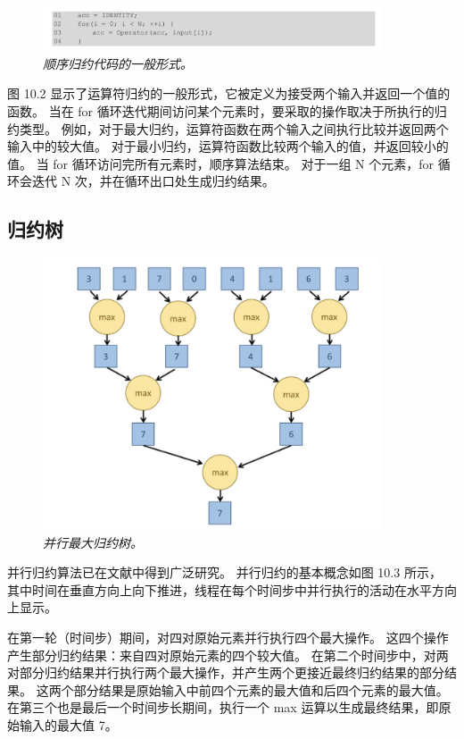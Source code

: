 \begin{figure}[H]
	\centering
	\includegraphics[width=0.9\textwidth]{figs/F10.2.png}
	\caption{\textit{顺序归约代码的一般形式。}}
\end{figure}

图 10.2 显示了运算符归约的一般形式，它被定义为接受两个输入并返回一个值的函数。 
当在 for 循环迭代期间访问某个元素时，要采取的操作取决于所执行的归约类型。 
例如，对于最大归约，运算符函数在两个输入之间执行比较并返回两个输入中的较大值。 
对于最小归约，运算符函数比较两个输入的值，并返回较小的值。 当 for 循环访问完所有元素时，顺序算法结束。 
对于一组 N 个元素，for 循环会迭代 N 次，并在循环出口处生成归约结果。

\subsection{归约树}
\begin{figure}[H]
	\centering
	\includegraphics[width=0.9\textwidth]{figs/F10.3.png}
	\caption{\textit{并行最大归约树。}}
\end{figure}

并行归约算法已在文献中得到广泛研究。 并行归约的基本概念如图 10.3 所示，
其中时间在垂直方向上向下推进，线程在每个时间步中并行执行的活动在水平方向上显示。

在第一轮（时间步）期间，对四对原始元素并行执行四个最大操作。 这四个操作产生部分归约结果：来自四对原始元素的四个较大值。 
在第二个时间步中，对两对部分归约结果并行执行两个最大操作，并产生两个更接近最终归约结果的部分结果。 
这两个部分结果是原始输入中前四个元素的最大值和后四个元素的最大值。 
在第三个也是最后一个时间步长期间，执行一个 max 运算以生成最终结果，即原始输入的最大值 7。

